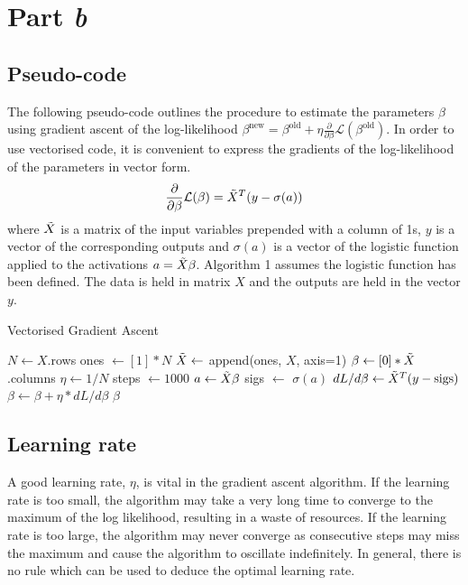 \documentclass[twocolumn]{article}
\begin{document}
\section{Part \textit{b}}

\subsection{Pseudo-code}

The following pseudo-code outlines the procedure to estimate the parameters $\beta$ using gradient ascent of the log-likelihood $\beta^{\text{new}}=\beta^{\text{old}}+\eta\frac{\partial}{\partial \beta}\mathcal{L}(\beta^{\text{old}})$. In order to use vectorised code, it is convenient to express the gradients of the log-likelihood of the parameters in vector form.
$$\frac{\partial}{\partial \beta}\mathcal{L}(\beta)=\Tilde{X}^T(y-\sigma(a))$$
where $\Tilde{X}$ is a matrix of the input variables prepended with a column of 1s, $y$ is a vector of the corresponding outputs and $\sigma(a)$ is a vector of the logistic function applied to the activations $a=\Tilde{X}\beta$. Algorithm 1 assumes the logistic function has been defined. The data is held in matrix $X$ and the outputs are held in the vector $y$.

\begin{algorithm}
\caption{Vectorised Gradient Ascent}
\begin{algorithmic}
\STATE $N\leftarrow X$.rows
\STATE ones $\leftarrow \left[1\right]*N$
\STATE $\Tilde{X}\leftarrow$ append(ones, $X$, axis=1)
\STATE $\beta\leftarrow \left[0\right]*\Tilde{X}$.columns
\STATE $\eta\leftarrow1/N$
\STATE steps $\leftarrow 1000$
\STATE $a \leftarrow \Tilde{X}\beta$
\STATE sigs $\leftarrow$ $\sigma(a)$
\STATE $dL/d\beta \leftarrow \Tilde{X}^T(y-\text{sigs})$
\STATE $\beta\leftarrow\beta+\eta*dL/d\beta$
\ENDFOR
\RETURN $\beta$
\end{algorithmic}
\end{algorithm}

\subsection{Learning rate}
A good learning rate, $\eta$, is vital in the gradient ascent algorithm. If the learning rate is too small, the algorithm may take a very long time to converge to the maximum of the log likelihood, resulting in a waste of resources. If the learning rate is too large, the algorithm may never converge as consecutive steps may miss the maximum and cause the algorithm to oscillate indefinitely. In general, there is no rule which can be used to deduce the optimal learning rate.
\end{document}
